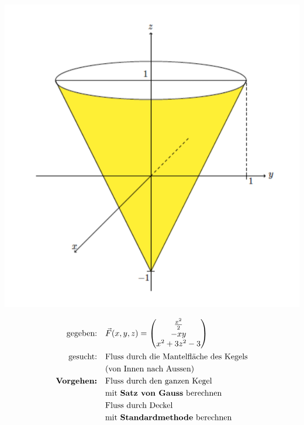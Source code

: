 \documentclass[11pt]{article}
\begin{document}
\begin{minipage}[c]{0.5\textwidth}
\centering
\includegraphics[width=\linewidth,keepaspectratio=true]{images/fluss}
\end{minipage}
%
\begin{minipage}[c]{0.5\textwidth}
\begin{equation*}
\begin{split}
	\text{gegeben:}\quad & \vec{F}(x,y,z) = \begin{pmatrix}
		\frac{x^2}{2} \\ -xy \\ x^2 + 3z^2 - 3
	\end{pmatrix} \\
	\text{gesucht:}\quad & \text{Fluss durch die Mantelfl{\"a}che des Kegels} \\
	& \text{(von Innen nach Aussen)} \\
	\textbf{Vorgehen:}\quad & \text{Fluss durch den ganzen Kegel} \\
	& \text{mit \textbf{Satz von Gauss} berechnen} \\
	& \text{Fluss durch Deckel} \\
	& \text{mit \textbf{Standardmethode} berechnen}
\end{split}
\end{equation*}
\end{minipage}
\end{document}

